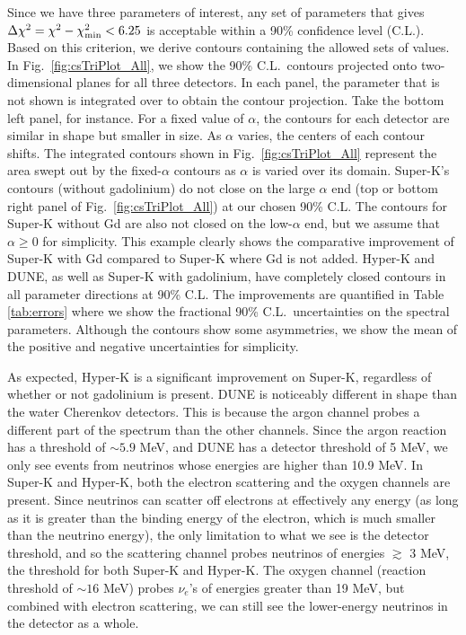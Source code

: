 \documentclass[aps,reprint,superscriptaddress]{revtex4-1}
\begin{document}
Since we have three parameters of interest, any set of parameters that gives $\Delta\chi^{2} = \chi^{2}-\chi_{\rm min}^{2} < 6.25$ is acceptable within a 90\% confidence level (C.L.). Based on this criterion, we derive contours containing the allowed sets of values. In Fig.~\ref{fig:csTriPlot_All}, we show the 90\% C.L.~contours projected onto two-dimensional planes for all three detectors. In each panel, the parameter that is not shown is integrated over to obtain the contour projection. Take the bottom left panel, for instance. For a fixed value of $\alpha$, the contours for each detector are similar in shape but smaller in size. As $\alpha$ varies, the centers of each contour shifts. The integrated contours shown in Fig.~\ref{fig:csTriPlot_All} represent the area swept out by the fixed-$\alpha$ contours as $\alpha$ is varied over its domain.  Super-K's contours (without gadolinium) do not close on the large $\alpha$ end (top or bottom right panel of Fig.~\ref{fig:csTriPlot_All}) at our chosen 90\% C.L. The contours for Super-K without Gd are also not closed on the low-$\alpha$ end, but we assume that $\alpha\geq0$ for simplicity.  This example clearly shows the comparative improvement of Super-K with Gd compared to Super-K where Gd is not added.  Hyper-K and DUNE, as well as Super-K with gadolinium, have completely closed contours in all parameter directions at 90\% C.L. The improvements are quantified in Table \ref{tab:errors} where we show the fractional 90\% C.L.~uncertainties on the spectral parameters. Although the contours show some asymmetries, we show the mean of the positive and negative uncertainties for simplicity. 

As expected, Hyper-K is a significant improvement on Super-K, regardless of whether or not gadolinium is present.  DUNE is noticeably different in shape than the water Cherenkov detectors. This is because the argon channel probes a different part of the spectrum than the other channels. Since the argon reaction has a threshold of $\sim5.9$ MeV, and DUNE has a detector threshold of 5 MeV, we only see events from neutrinos whose energies are higher than 10.9 MeV. In Super-K and Hyper-K, both the electron scattering and the oxygen channels are present.  Since neutrinos can scatter off electrons at effectively any energy (as long as it is greater than the binding energy of the electron, which is much smaller than the neutrino energy), the only limitation to what we see is the detector threshold, and so the scattering channel probes neutrinos of energies $\gtrsim$ 3 MeV, the threshold for both Super-K and Hyper-K.  The oxygen channel (reaction threshold of $\sim16$ MeV) probes $\nu_e$'s of energies greater than 19 MeV, but combined with electron scattering, we can still see the lower-energy neutrinos in the detector as a whole.
\end{document}

